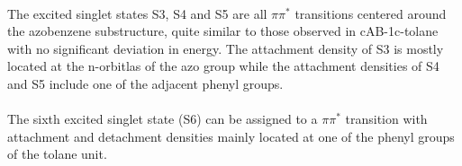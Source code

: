 \\
The excited singlet states S3, S4 and S5 are all $\pi\pi^{*}$ transitions centered around the azobenzene substructure, quite similar to those observed in cAB-1c-tolane with no significant deviation in energy. 
The attachment density of S3 is mostly located at the n-orbitlas of the azo group while the attachment densities of S4 and S5 include one of the adjacent phenyl groups.\\
\\
The sixth excited singlet state (S6) can be assigned to a $\pi\pi^*$ transition with attachment and detachment densities mainly located at one of the phenyl groups of the tolane unit.
% 
%
%
%
